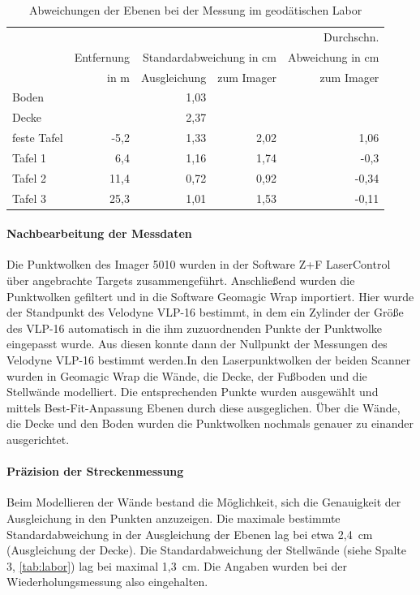 \documentclass[a4paper,12pt,bibliography=totoc, listof=totoc,titlepage,pointlessnumbers]{scrreprt}
\begin{document}
\begin{table}
\centering
\begin{tabular}{|l|r|r|r|r|}
\cline{2-4}
\hline
		& 		& \multicolumn{2}{r|}{} 	&  Durchschn.\\
		& Entfernung	& \multicolumn{2}{r|}{Standardabweichung in cm} & Abweichung in cm\\
		& in m		& Ausgleichung	& zum Imager 	& zum Imager \\ \hline
Boden		&		& 1,03		&		& 	\\ \hline
Decke		& 	    	& 2,37		&		& 	\\ \hline
feste Tafel	& -5,2		& 1,33		& 2,02		& 1,06	\\ \hline
Tafel 1		& 6,4      	& 1,16		& 1,74		& -0,3	\\ \hline
Tafel 2		& 11,4     	& 0,72		& 0,92		& -0,34	\\ \hline
Tafel 3		& 25,3     	& 1,01		& 1,53		& -0,11	\\ \hline
\end{tabular}
\caption{Abweichungen der Ebenen bei der Messung im geodätischen Labor}
\label{tab:labor}
\end{table}

\paragraph{Nachbearbeitung der Messdaten}
Die Punktwolken des Imager 5010 wurden in der Software Z+F LaserControl über angebrachte Targets zusammengeführt. Anschließend wurden die Punktwolken gefiltert und in die Software Geomagic Wrap importiert. Hier wurde der Standpunkt des Velodyne VLP-16 bestimmt, in dem ein Zylinder der Größe des VLP-16 automatisch in die ihm zuzuordnenden Punkte der Punktwolke eingepasst wurde.  Aus diesen konnte dann der Nullpunkt der Messungen des Velodyne VLP-16 bestimmt werden.In den Laserpunktwolken der beiden Scanner wurden in Geomagic Wrap die Wände, die Decke, der Fußboden und die Stellwände modelliert. Die entsprechenden Punkte wurden ausgewählt und mittels Best-Fit-Anpassung Ebenen durch diese ausgeglichen. Über die Wände, die Decke und den Boden wurden die Punktwolken nochmals genauer zu einander ausgerichtet.

\paragraph{Präzision der Streckenmessung}
Beim Modellieren der Wände bestand die Mög\-lich\-keit, sich die Genauigkeit der Ausgleichung in den Punkten anzuzeigen. Die maximale bestimmte Standardabweichung in der Ausgleichung der Ebenen lag bei etwa 2,4~cm (Ausgleichung der Decke). Die Standardabweichung der Stellwände (siehe Spalte 3, \autoref{tab:labor}) lag bei maximal 1,3~cm. Die Angaben wurden bei der Wiederholungsmessung also eingehalten.
\end{document}
